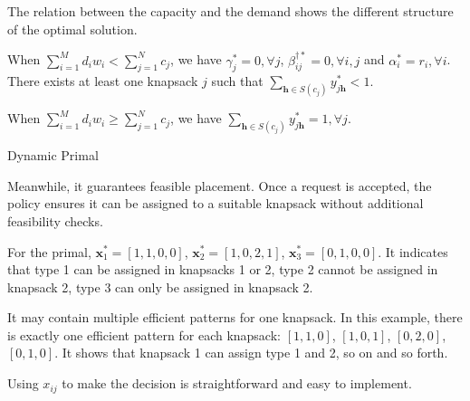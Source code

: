 The relation between the capacity and the demand shows the different structure of the optimal solution.

\begin{lem}
When $\sum_{i=1}^{M} d_{i} w_{i} < \sum_{j=1}^{N} c_{j}$, we have $\gamma_{j}^{*} =0, \forall j$, $\beta_{ij}^{\dag *} =0, \forall i,j$ and $\alpha^{*}_{i} = r_i, \forall i$. There exists at least one knapsack $j$ such that $\sum_{\bm{h} \in S(c_{j})} y_{j \bm{h}}^{*} < 1$.

When $\sum_{i=1}^{M} d_{i} w_{i} \geq \sum_{j=1}^{N} c_{j}$, we have $\sum_{\bm{h} \in S(c_{j})} y_{j \bm{h}}^{*} = 1, \forall j$.
\end{lem}


\begin{algorithm}[H]
    \caption{Dynamic Primal}\label{algo_improve_primal}
\end{algorithm}

Meanwhile, it guarantees feasible placement. Once a request is accepted, the policy ensures it can be assigned to a suitable knapsack without additional feasibility checks.

\begin{example}
For the primal, $\bm{x}_{1}^{*} = [1, 1, 0, 0]$, $\bm{x}_{2}^{*} = [1, 0, 2, 1]$, $\bm{x}_{3}^{*} = [0, 1, 0, 0]$. It indicates that type 1 can be assigned in knapsacks 1 or 2, type 2 cannot be assigned in knapsack 2, type 3 can only be assigned in knapsack 2. 

It may contain multiple efficient patterns for one knapsack. In this example, there is exactly one efficient pattern for each knapsack: $[1, 1, 0]$, $[1, 0, 1]$, $[0, 2, 0]$, $[0, 1, 0]$. It shows that knapsack 1 can assign type 1 and 2, so on and so forth.

Using $x_{ij}$ to make the decision is straightforward and easy to implement.
\end{example}


